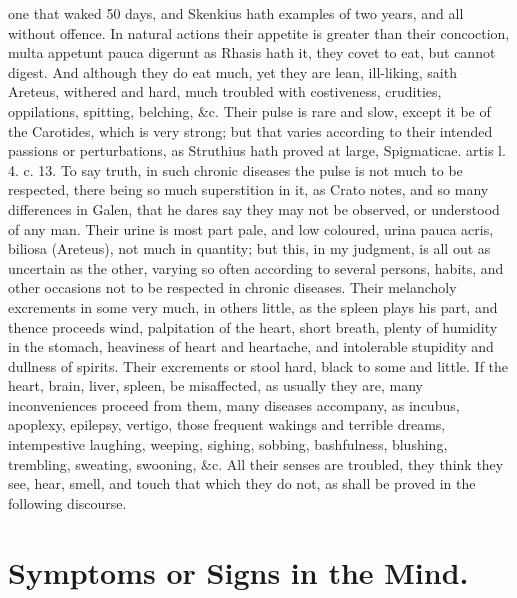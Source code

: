 {one that waked 50 days, and Skenkius hath examples of two years, and
all without offence. In natural actions their appetite is greater than
their concoction, multa appetunt pauca digerunt as Rhasis hath it, they
covet to eat, but cannot digest. And although they do eat much,
yet they are lean, ill-liking, saith Areteus, withered and hard, much
troubled with costiveness, crudities, oppilations, spitting, belching,
\&c. Their pulse is rare and slow, except it be of the Carotides,
which is very strong; but that varies according to their intended
passions or perturbations, as Struthius hath proved at large,
Spigmaticae. artis l. 4. c. 13. To say truth, in such chronic diseases
the pulse is not much to be respected, there being so much superstition
in it, as Crato notes, and so many differences in Galen, that he
dares say they may not be observed, or understood of any man.
Their urine is most part pale, and low coloured, urina pauca acris,
biliosa (Areteus), not much in quantity; but this, in my judgment, is
all out as uncertain as the other, varying so often according to
several persons, habits, and other occasions not to be respected in
chronic diseases. Their melancholy excrements in some very much,
in others little, as the spleen plays his part, and thence proceeds
wind, palpitation of the heart, short breath, plenty of humidity in the
stomach, heaviness of heart and heartache, and intolerable stupidity
and dullness of spirits. Their excrements or stool hard, black to some
and little. If the heart, brain, liver, spleen, be misaffected, as
usually they are, many inconveniences proceed from them, many diseases
accompany, as incubus, apoplexy, epilepsy, vertigo, those
frequent wakings and terrible dreams, intempestive laughing,
weeping, sighing, sobbing, bashfulness, blushing, trembling, sweating,
swooning, \&c. All their senses are troubled, they think they see,
hear, smell, and touch that which they do not, as shall be proved in
the following discourse.

\section{Symptoms or Signs in the Mind.}

}
